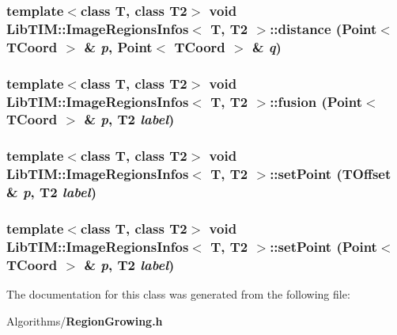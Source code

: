 \subsubsection{\setlength{\rightskip}{0pt plus 5cm}template$<$class T, class T2$>$ void {\bf Lib\-TIM::Image\-Regions\-Infos}$<$ T, T2 $>$::distance ({\bf Point}$<$ {\bf TCoord} $>$ \& {\em p}, {\bf Point}$<$ {\bf TCoord} $>$ \& {\em q})\hspace{0.3cm}{\tt  [inline]}}\label{classLibTIM_1_1ImageRegionsInfos_a5}


\subsubsection{\setlength{\rightskip}{0pt plus 5cm}template$<$class T, class T2$>$ void {\bf Lib\-TIM::Image\-Regions\-Infos}$<$ T, T2 $>$::fusion ({\bf Point}$<$ {\bf TCoord} $>$ \& {\em p}, T2 {\em label})\hspace{0.3cm}{\tt  [inline]}}\label{classLibTIM_1_1ImageRegionsInfos_a6}


\subsubsection{\setlength{\rightskip}{0pt plus 5cm}template$<$class T, class T2$>$ void {\bf Lib\-TIM::Image\-Regions\-Infos}$<$ T, T2 $>$::set\-Point ({\bf TOffset} \& {\em p}, T2 {\em label})\hspace{0.3cm}{\tt  [inline]}}\label{classLibTIM_1_1ImageRegionsInfos_a4}


\subsubsection{\setlength{\rightskip}{0pt plus 5cm}template$<$class T, class T2$>$ void {\bf Lib\-TIM::Image\-Regions\-Infos}$<$ T, T2 $>$::set\-Point ({\bf Point}$<$ {\bf TCoord} $>$ \& {\em p}, T2 {\em label})\hspace{0.3cm}{\tt  [inline]}}\label{classLibTIM_1_1ImageRegionsInfos_a3}




The documentation for this class was generated from the following file:\begin{CompactItemize}
\item 
Algorithms/{\bf Region\-Growing.h}\end{CompactItemize}
